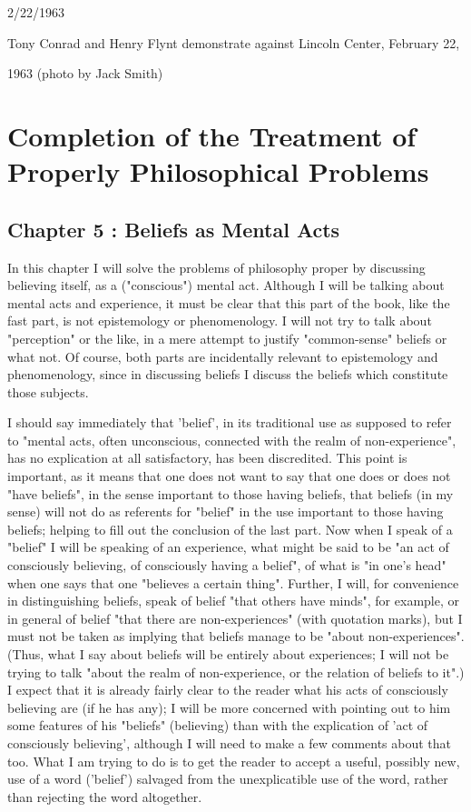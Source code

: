 \documentclass[10pt,twoside]{memoir}
\begin{document}
\begin{enumerate}
{\clearpage


2/22/1963 


Tony Conrad and Henry Flynt demonstrate 
against Lincoln Center, February 22, 


1963 
(photo by Jack Smith)

\clearpage


\section{Completion of the Treatment of Properly Philosophical Problems}


\subsection*{Chapter 5 : Beliefs as Mental Acts}


In this chapter I will solve the problems of philosophy proper by 
discussing believing itself, as a ("conscious") mental act. Although I will be 
talking about mental acts and experience, it must be clear that this part of 
the book, like the fast part, is not epistemology or phenomenology. I will 
not try to talk about "perception" or the like, in a mere attempt to justify 
"common-sense" beliefs or what not. Of course, both parts are incidentally 
relevant to epistemology and phenomenology, since in discussing beliefs I 
discuss the beliefs which constitute those subjects. 

I should say immediately that 'belief', in its traditional use as supposed 
to refer to "mental acts, often unconscious, connected with the realm of 
non-experience", has no explication at all satisfactory, has been discredited. 
This point is important, as it means that one does not want to say that one 
does or does not "have beliefs", in the sense important to those having 
beliefs, that beliefs (in my sense) will not do as referents for "belief" in the 
use important to those having beliefs; helping to fill out the conclusion of 
the last part. Now when I speak of a "belief" I will be speaking of an 
experience, what might be said to be "an act of consciously believing, of 
consciously having a belief", of what is "in one's head" when one says that 
one "believes a certain thing". Further, I will, for convenience in 
distinguishing beliefs, speak of belief "that others have minds", for example, 
or in general of belief "that there are non-experiences" (with quotation 
marks), but I must not be taken as implying that beliefs manage to be 
"about non-experiences". (Thus, what I say about beliefs will be entirely 
about experiences; I will not be trying to talk "about the realm of 
non-experience, or the relation of beliefs to it".) I expect that it is already 
fairly clear to the reader what his acts of consciously believing are (if he has 
any); I will be more concerned with pointing out to him some features of his 
"beliefs" (believing) than with the explication of 'act of consciously 
believing', although I will need to make a few comments about that too. 
What I am trying to do is to get the reader to accept a useful, possibly new, 
use of a word ('belief') salvaged from the unexplicatible use of the word, 
rather than rejecting the word altogether. 

}
\end{enumerate}
\end{document}
